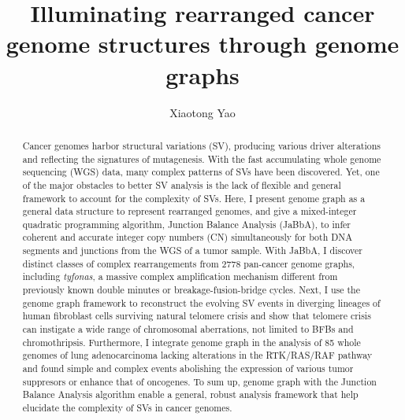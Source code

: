 \documentclass[phd,tocprelim]{cornell}
\title{Illuminating rearranged cancer genome structures through genome graphs}
\author {Xiaotong Yao}
\begin{document}
\maketitle
\makecopyright

\begin{abstract}

Cancer genomes harbor structural variations (SV), producing various driver alterations and reflecting the signatures of mutagenesis. With the fast accumulating whole genome sequencing (WGS) data, many complex patterns of SVs have been discovered. Yet, one of the major obstacles to better SV analysis is the lack of flexible and general framework to account for the complexity of SVs. Here, I present genome graph as a general data structure to represent rearranged genomes, and give a mixed-integer quadratic programming algorithm, Junction Balance Analysis (JaBbA), to infer coherent and accurate integer copy numbers (CN) simultaneously for both DNA segments and junctions from the WGS of a tumor sample. With JaBbA, I discover distinct classes of complex rearrangements from 2778 pan-cancer genome graphs, including \textit{tyfonas}, a massive complex amplification mechanism different from previously known double minutes or breakage-fusion-bridge cycles. Next, I use the genome graph framework to reconstruct the evolving SV events in diverging lineages of human fibroblast cells surviving natural telomere crisis and show that telomere crisis can instigate a wide range of chromosomal aberrations, not limited to BFBs and chromothripsis. Furthermore, I integrate genome graph in the analysis of 85 whole genomes of lung adenocarcinoma lacking alterations in the RTK/RAS/RAF pathway and found simple and complex events abolishing the expression of various tumor suppresors or enhance that of oncogenes. To sum up, genome graph with the Junction Balance Analysis algorithm enable a general, robust analysis framework that help elucidate the complexity of SVs in cancer genomes.

\end{abstract}
\end{document}

